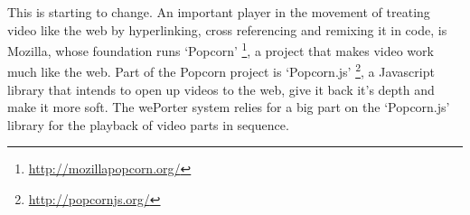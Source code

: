 This is starting to change. An important player in the movement of treating video like the web by hyperlinking, cross referencing and remixing it in code, is Mozilla, whose foundation runs `Popcorn' \footnote{\url{http://mozillapopcorn.org/}}, a project that makes video work much like the web. Part of the Popcorn project is `Popcorn.js' \footnote{\url{http://popcornjs.org/}}, a Javascript library that intends to open up videos to the web, give it back it's depth and make it more soft. The wePorter system relies for a big part on the `Popcorn.js' library for the playback of video parts in sequence.

